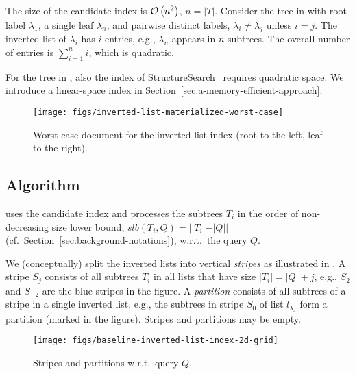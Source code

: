 The size of the candidate index is $\mathcal{O} \left( n^2 \right)$, $n=|T|$. Consider the tree in  with root label $\lambda_1$, a single leaf $\lambda_n$, and pairwise distinct labels, $\lambda_i\neq \lambda_j$ unless $i= j$. The inverted list of $\lambda_i$ has $i$ entries, e.g., $\lambda_n$ appears in $n$ subtrees. The overall number of entries is $\sum_{i=1}^{n}i$, which is quadratic.

For the tree in , also the index
of  StructureSearch~\cite{cohen-sigmod-2013} requires quadratic space. We
introduce a linear-space index in
Section~\ref{sec:a-memory-efficient-approach}.

\begin{figure}[ht!]
  \centering
  \texttt{[image: figs/inverted-list-materialized-worst-case]}
  \caption{Worst-case document for the inverted list index (root to the left, leaf to the right).}
  \label{fig:inverted-list-materialized-worst-case}
\end{figure}

\subsection{\lowerboundmerge{} Algorithm}
\label{subsec:baseline-algorithms}

\lowerboundmerge{} uses the candidate index and processes the subtrees $T_i$ in  the order of non-decreasing size lower bound, $slb(T_i,Q)=||T_i|-|Q||$ (cf.\
Section~\ref{sec:background-notations}), w.r.t.\ the query $Q$.

We (conceptually) split the inverted lists into vertical \emph{stripes} as illustrated in . A stripe $S_j$ consists of all subtrees $T_i$ in all lists that have size $|T_i|=|Q|+j$, e.g., $S_2$ and $S_{-2}$ are the blue stripes in the figure. A \emph{partition} consists of all subtrees of a stripe in a single inverted list, e.g., the subtrees in stripe $S_0$ of list $l_{\lambda_4}$ form a partition (marked in the figure). Stripes and partitions may be empty.

\begin{figure}[ht!]
  \centering
  \texttt{[image: figs/baseline-inverted-list-index-2d-grid]}
  \caption{Stripes and partitions w.r.t.\ query $Q$.}
  \label{fig:baseline-inverted-list-index-2d-grid}
\end{figure}

